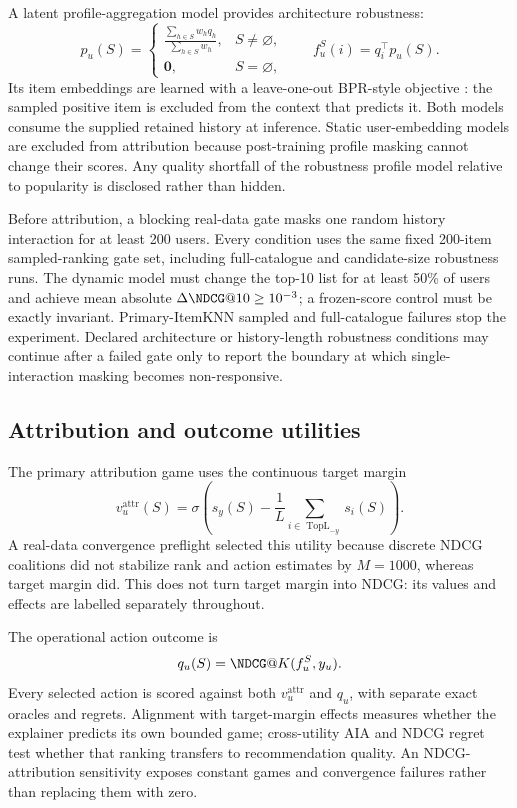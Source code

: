 \documentclass[pdflatex,sn-basic]{sn-jnl}
\begin{document}
A latent profile-aggregation model provides architecture robustness:
\begin{equation}
p_u(S)=
\begin{cases}
\displaystyle\frac{\sum_{h\in S}w_hq_h}{\sum_{h\in S}w_h},&S\ne\varnothing,\\[6pt]
\mathbf 0,&S=\varnothing,
\end{cases}
\qquad f_u^S(i)=q_i^\top p_u(S).
\end{equation}
Its item embeddings are learned with a leave-one-out BPR-style objective \citep{rendle2009}: the sampled positive item is excluded from the context that predicts it. Both models consume the supplied retained history at inference. Static user-embedding models are excluded from attribution because post-training profile masking cannot change their scores. Any quality shortfall of the robustness profile model relative to popularity is disclosed rather than hidden.

Before attribution, a blocking real-data gate masks one random history interaction for at least 200 users. Every condition uses the same fixed 200-item sampled-ranking gate set, including full-catalogue and candidate-size robustness runs. The dynamic model must change the top-10 list for at least 50\% of users and achieve mean absolute $\Delta\NDCG@10\ge10^{-3}$; a frozen-score control must be exactly invariant. Primary-ItemKNN sampled and full-catalogue failures stop the experiment. Declared architecture or history-length robustness conditions may continue after a failed gate only to report the boundary at which single-interaction masking becomes non-responsive.

\subsection{Attribution and outcome utilities}
The primary attribution game uses the continuous target margin
\begin{equation}
v_u^{\mathrm{attr}}(S)=\sigma\!\left(s_y(S)-\frac{1}{L}\sum_{i\in\operatorname{TopL}_{-y}}s_i(S)\right).
\end{equation}
A real-data convergence preflight selected this utility because discrete NDCG coalitions did not stabilize rank and action estimates by $M=1000$, whereas target margin did. This does not turn target margin into NDCG: its values and effects are labelled separately throughout.

The operational action outcome is
\begin{equation}
q_u(S)=\NDCG@K(f_u^S,y_u).
\end{equation}
Every selected action is scored against both $v_u^{\mathrm{attr}}$ and $q_u$, with separate exact oracles and regrets. Alignment with target-margin effects measures whether the explainer predicts its own bounded game; cross-utility AIA and NDCG regret test whether that ranking transfers to recommendation quality. An NDCG-attribution sensitivity exposes constant games and convergence failures rather than replacing them with zero.
\end{document}
